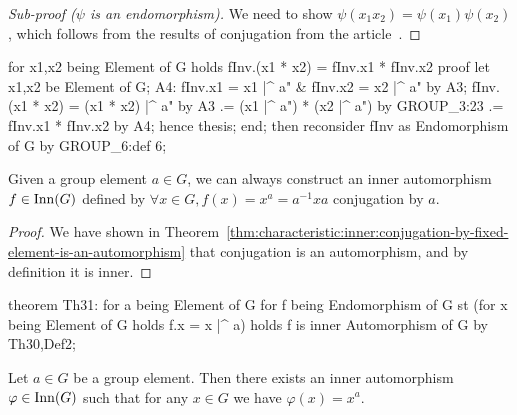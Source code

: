 \begin{proof}[Sub-proof ($\psi$ is an endomorphism)]
We need to show $\psi(x_{1}x_{2})=\psi(x_{1})\psi(x_{2})$, which follows
from the results of conjugation from the article~.
\end{proof}

\nwenddocs{}\endmoddef\nwstartdeflinemarkup{}\nwenddeflinemarkup
for x1,x2 being Element of G holds fInv.(x1 * x2) = fInv.x1 * fInv.x2
proof
  let x1,x2 be Element of G;
  A4: fInv.x1 = x1 |^ a" & fInv.x2 = x2 |^ a" by A3;
  fInv.(x1 * x2) = (x1 * x2) |^ a" by A3
                .= (x1 |^ a") * (x2 |^ a") by GROUP_3:23
                .= fInv.x1 * fInv.x2 by A4;
  hence thesis;
end;
then reconsider fInv as Endomorphism of G by GROUP_6:def 6;
\nwendcode{}\nwdocspar

\begin{corollary}\label{thm:characteristic:inner:conjugation-as-endomorphism-is-inner-automorphism}
Given a group element $a\in G$, we can always construct an
inner automorphism $f\in\operatorname{Inn}(G)$ defined by
$\forall x\in G,f(x)=x^{a}=a^{-1}xa$ conjugation by $a$.
\end{corollary}

\begin{proof}
We have shown in Theorem~\ref{thm:characteristic:inner:conjugation-by-fixed-element-is-an-automorphism} that conjugation is an automorphism, and by
definition it is inner.
\end{proof}

\nwenddocs{}\endmoddef\nwstartdeflinemarkup{}\nwenddeflinemarkup
theorem Th31:
  for a being Element of G
  for f being Endomorphism of G
  st (for x being Element of G holds f.x = x |^ a)
  holds f is inner Automorphism of G by Th30,Def2;
\eatline
{}\nwendcode{}\nwdocspar
\begin{theorem}
Let $a\in G$ be a group element. Then there exists an inner automorphism
$\varphi\in\operatorname{Inn}(G)$ such that for any $x\in G$ we have $\varphi(x)=x^{a}$.
\end{theorem}

